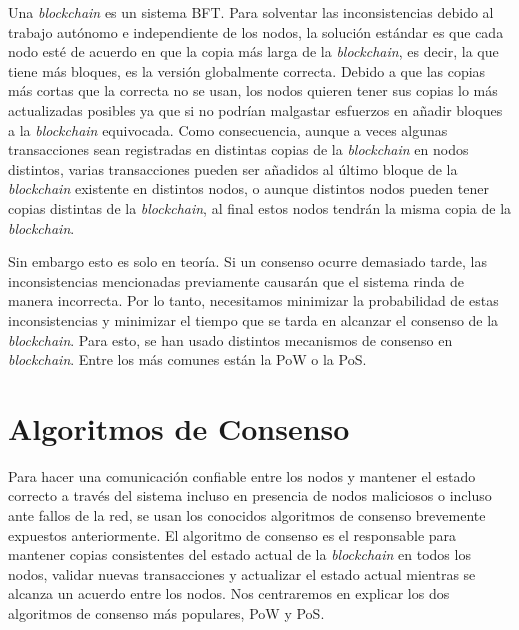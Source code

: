 Una \textit{blockchain} es un sistema \ac{BFT}. Para solventar las inconsistencias debido al trabajo autónomo e independiente de los nodos, la solución estándar es que cada nodo esté de acuerdo en que la copia más larga de la \textit{blockchain}, es decir, la que tiene más bloques, es la versión globalmente correcta. Debido a que las copias más cortas que la correcta no se usan, los nodos quieren tener sus copias lo más actualizadas posibles ya que si no podrían malgastar esfuerzos en añadir bloques a la \textit{blockchain} equivocada. Como consecuencia, aunque a veces algunas transacciones sean registradas en distintas copias de la \textit{blockchain} en nodos distintos, varias transacciones pueden ser añadidos al último bloque de la \textit{blockchain} existente en distintos nodos, o aunque distintos nodos pueden tener copias distintas de la \textit{blockchain}, al final estos nodos tendrán la misma copia de la \textit{blockchain}.

Sin embargo esto es solo en teoría. Si un consenso ocurre demasiado tarde, las inconsistencias mencionadas previamente causarán que el sistema rinda de manera incorrecta. Por lo tanto, necesitamos minimizar la probabilidad de estas inconsistencias y minimizar el tiempo que se tarda en alcanzar el consenso de la \textit{blockchain}. Para esto, se han usado distintos mecanismos de consenso en \textit{blockchain}. Entre los más comunes están la \ac{PoW} o la \ac{PoS}.

\section{Algoritmos de Consenso}
Para hacer una comunicación confiable entre los nodos y mantener el estado correcto a través del sistema incluso en presencia de nodos maliciosos o incluso ante fallos de la red, se usan los conocidos algoritmos de consenso brevemente expuestos anteriormente. El algoritmo de consenso es el responsable para mantener copias consistentes del estado actual de la \textit{blockchain} en todos los nodos, validar nuevas transacciones y actualizar el estado actual mientras se alcanza un acuerdo entre los nodos. Nos centraremos en explicar los dos algoritmos de consenso más populares, \ac{PoW} y \ac{PoS}.
